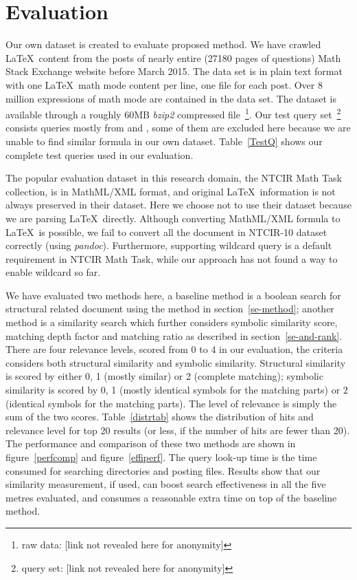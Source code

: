 \documentclass{acm_proc_article-sp}
\begin{document}
\section{Evaluation}
Our own dataset is created to evaluate proposed method.
We have crawled \LaTeX\ content from the posts of nearly entire (27180 pages of questions) Math Stack Exchange website before March 2015. 
The data set is in plain text format with one \LaTeX\ math mode content per line, one file for each post. 
Over 8 million expressions of math mode are contained in the data set. 
The dataset is available through a roughly 60MB \textit{bzip2} compressed file~\footnote{raw data: [link not revealed here for anonymity]}.
Our test query set~\footnote{query set: [link not revealed here for anonymity]} consists queries mostly from \cite{ntcirtopic} and \cite{symbolpairs15}, some of them are excluded here because we are unable to find similar formula in our own dataset.
Table~\ref{TestQ} shows our complete test queries used in our evaluation. 

The popular evaluation dataset in this research domain, the NTCIR Math Task collection, is in MathML/XML format, and original \LaTeX\ information is not always preserved in their dataset. 
Here we choose not to use their dataset because we are parsing \LaTeX\ directly.
Although converting MathML/XML formula to \LaTeX\ is possible, we fail to convert all the document in NTCIR-10 dataset correctly (using \textit{pandoc}).
Furthermore, supporting wildcard query is a default requirement in NTCIR Math Task, while our approach has not found a way to enable wildcard so far.

We have evaluated two methods here, a baseline method is a boolean search for structural related document using the method in section~\ref{se-method}; another method is a similarity search which further considers symbolic similarity score, matching depth factor and matching ratio as described in section~\ref{se-and-rank}.
There are four relevance levels, scored from 0 to 4 in our evaluation,
the criteria considers both structural similarity and symbolic similarity. 
Structural similarity is scored by either 0, 1 (mostly similar) or 2 (complete matching);
symbolic similarity is scored by 0, 1 (mostly identical symbols for the matching parts) or 2 (identical symbols for the matching parts).
The level of relevance is simply the sum of the two scores.
Table~\ref{distrtab} shows the distribution of hits and relevance level for top 20 results (or less, if the number of hits are fewer than 20).
The performance and comparison of these two methods are shown in figure~\ref{perfcomp} and figure~\ref{effiperf}. 
The query look-up time is the time consumed for searching directories and posting files.
Results show that our similarity measurement, if used, can boost search effectiveness in all the five metres evaluated, 
and consumes a reasonable extra time on top of the baseline method. 
\end{document}
